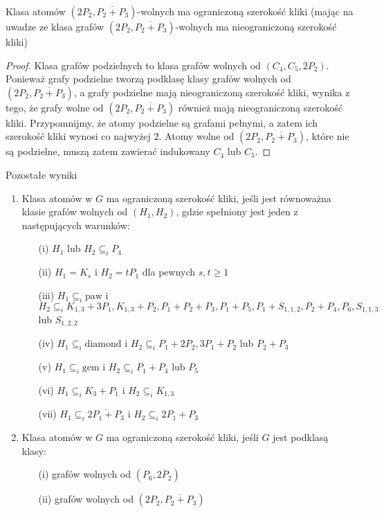\documentclass[polish]{beamer}
\begin{document}
\begin{frame}
    \begin{theorem}
        Klasa atomów $(2P_2, \overline{P_2 + P_3})$-wolnych ma ograniczoną szerokość kliki (mając na uwadze ze klasa grafów $(2P_2, \overline{P_2 + P_3})$-wolnych ma nieograniczoną szerokość kliki)
    \end{theorem}
    \begin{proof}
        Klasa grafów podzielnych to klasa grafów wolnych od $(C_4, C_5, 2P_2)$. Ponieważ grafy podzielne tworzą podklasę klasy grafów wolnych od $(2P_2, \overline{P_2 + P_3})$, a grafy podzielne mają nieograniczoną szerokość kliki, wynika z tego, że grafy wolne od $(2P_2, \overline{P_2 + P_3})$ również mają nieograniczoną szerokość kliki. Przypomnijmy, że atomy podzielne są grafami pełnymi, a zatem ich szerokość kliki wynosi co najwyżej 2. Atomy wolne od $(2P_2, \overline{P_2 + P_3})$, które nie są podzielne, muszą zatem zawierać indukowany $C_4$ lub $C_5$.
    \end{proof}
\end{frame}

\begin{frame}{Pozostałe wyniki}
    \begin{enumerate}
        \item Klasa atomów w $G$ ma ograniczoną szerokość kliki, jeśli jest równoważna klasie grafów wolnych od $(H_1, H_2)$, gdzie spełniony jest jeden z następujących warunków:
        \begin{itemize}
            \item[(i)] $H_1$ lub $H_2 \subseteq_i P_4$
            \item[(ii)] $H_1 = K_s$ i $H_2 = tP_1$ dla pewnych $s, t \geq 1$
            \item[(iii)] $H_1 \subseteq_i \text{paw}$ i $H_2 \subseteq_i K_{1,3} + 3P_1, K_{1,3} + P_2, P_1 + P_2 + P_3, P_1 + P_5, P_1 + S_{1,1,2}, P_2 + P_4, P_6, S_{1,1,3}$ lub $S_{1,2,2}$
            \item[(iv)] $H_1 \subseteq_i \text{diamond}$ i $H_2 \subseteq_i P_1 + 2P_2, 3P_1 + P_2$ lub $P_2 + P_3$
            \item[(v)] $H_1 \subseteq_i \text{gem}$ i $H_2 \subseteq_i P_1 + P_4$ lub $P_5$
            \item[(vi)] $H_1 \subseteq_i K_3 + P_1$ i $H_2 \subseteq_i K_{1,3}$
            \item[(vii)] $H_1 \subseteq_i \overline{2P_1 + P_3}$ i $H_2 \subseteq_i 2P_1 + P_3$
        \end{itemize}
        
        \item Klasa atomów w $G$ ma ograniczoną szerokość kliki, jeśli $G$ jest podklasą klasy:
        \begin{itemize}
            \item[(i)] grafów wolnych od $(P_6, \overline{2P_2})$
            \item[(ii)] grafów wolnych od $(2P_2, \overline{P_2 + P_3})$
        \end{itemize}
    \end{enumerate}
\end{frame}
\end{document}
